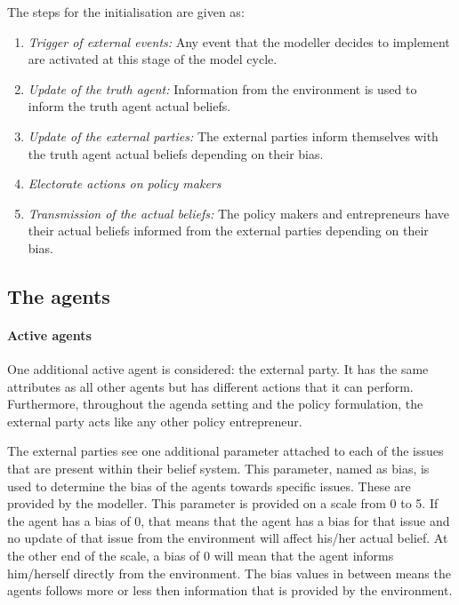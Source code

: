 \documentclass[11pt]{article}
\begin{document}
The steps for the initialisation are given as:

\begin{enumerate}
	
\item \emph{Trigger of external events:} Any event that the modeller decides to implement are activated at this stage of the model cycle.
\item \emph{Update of the truth agent:} Information from the environment is used to inform the truth agent actual beliefs.
\item \emph{Update of the external parties:} The external parties inform themselves with the truth agent actual beliefs depending on their bias.
\item \emph{Electorate actions on policy makers}
\item \emph{Transmission of the actual beliefs:} The policy makers and entrepreneurs have their actual beliefs informed from the external parties depending on their bias.

\end{enumerate}


\subsection{The agents}


\paragraph{Active agents}

One additional active agent is considered: the external party. It has the same attributes as all other agents but has different actions that it can perform. Furthermore, throughout the agenda setting and the policy formulation, the external party acts like any other policy entrepreneur.

The external parties see one additional parameter attached to each of the issues that are present within their belief system. This parameter, named as bias, is used to determine the bias of the agents towards specific issues. These are provided by the modeller. This parameter is provided on a scale from 0 to 5. If the agent has a bias of 0, that means that the agent has a bias for that issue and no update of that issue from the environment will affect his/her actual belief. At the other end of the scale, a bias of 0 will mean that the agent informs him/herself directly from the environment. The bias values in between means the agents follows more or less then information that is provided by the environment.
\end{document}
